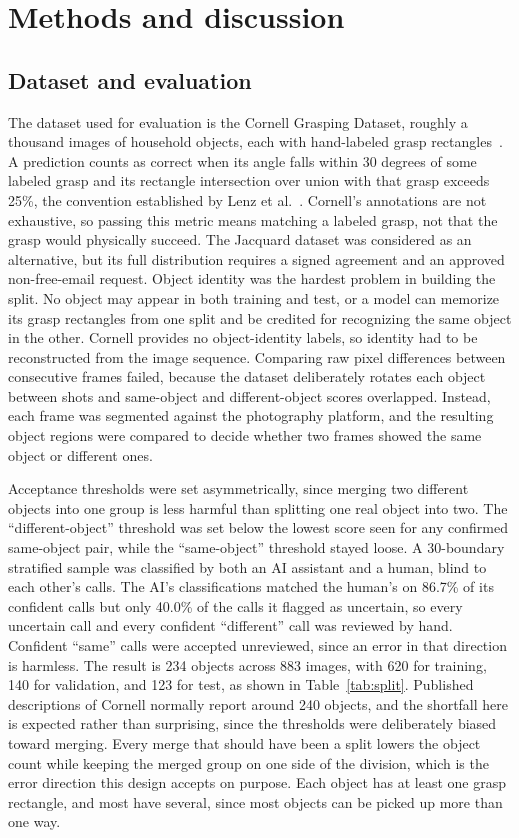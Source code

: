 \documentclass[12pt,letterpaper]{article}
\begin{document}
\section{Methods and discussion}

\subsection{Dataset and evaluation}

The dataset used for evaluation is the Cornell Grasping Dataset,
roughly a thousand images of household objects, each with hand-labeled
grasp rectangles~\cite{jiang2011}. A prediction counts as correct when
its angle falls within 30 degrees of some labeled grasp and its
rectangle intersection over union with that grasp exceeds 25\%, the
convention established by Lenz et al.~\cite{lenz2015}. Cornell's annotations are not
exhaustive, so passing this metric means matching a labeled grasp, not
that the grasp would physically succeed. The Jacquard dataset was
considered as an alternative, but its full distribution requires a
signed agreement and an approved non-free-email request. Object
identity was the hardest problem in building the split. No object may
appear in both training and test, or a model can memorize its grasp
rectangles from one split and be credited for recognizing the same
object in the other. Cornell provides no object-identity labels, so
identity had to be reconstructed from the image sequence. Comparing raw
pixel differences between consecutive frames failed, because the
dataset deliberately rotates each object between shots and same-object
and different-object scores overlapped. Instead, each frame was
segmented against the photography platform, and the resulting object
regions were compared to decide whether two frames showed the same
object or different ones.

Acceptance thresholds were set asymmetrically, since merging two
different objects into one group is less harmful than splitting one
real object into two. The ``different-object'' threshold was set below
the lowest score seen for any confirmed same-object pair, while the
``same-object'' threshold stayed loose. A 30-boundary stratified sample
was classified by both an AI assistant and a human, blind to each
other's calls. The AI's classifications matched the human's on 86.7\%
of its confident calls but only 40.0\% of the calls it flagged as
uncertain, so every uncertain call and every confident ``different'' call
was reviewed by hand. Confident ``same'' calls were accepted unreviewed,
since an error in that direction is harmless. The result is 234 objects
across 883 images, with 620 for training, 140 for validation, and 123
for test, as shown in Table~\ref{tab:split}. Published descriptions of
Cornell normally report around 240 objects, and the shortfall here is
expected rather than surprising, since the thresholds were deliberately
biased toward merging. Every merge that should have been a split lowers
the object count while keeping the merged group on one side of the
division, which is the error direction this design accepts on purpose.
Each object has at least one grasp rectangle, and most have several,
since most objects can be picked up more than one way.
\end{document}
